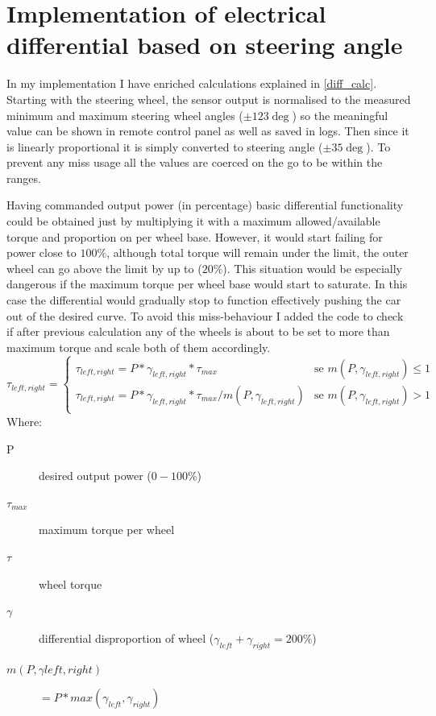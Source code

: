 \section{Implementation of electrical differential based on steering angle}\label{diff_meth}
In my implementation I have enriched calculations explained in \ref{diff_calc}. Starting with the steering wheel, the sensor output is normalised to the measured minimum and maximum steering wheel angles ($\pm123\deg$) so the meaningful value can be shown in remote control panel as well as saved in logs. 
Then since it is linearly proportional it is simply converted to steering angle ($\pm35\deg$). To prevent any miss usage all the values are coerced on the go to be within the ranges.

Having commanded output power (in percentage) basic differential functionality could be obtained just by multiplying it with a maximum allowed/available torque and proportion on per wheel base. However, it would start failing for power close to $100\% $, although total torque will remain under the limit, the outer wheel can go above the limit by up to ($20\% $).
This situation would be especially dangerous if the maximum torque per wheel base would start to saturate. In this case the differential would gradually stop to function effectively pushing the car out of the desired curve.
To avoid this miss-behaviour I added the code to check if after previous calculation any of the wheels is about to be set to more than maximum torque and scale both of them accordingly.
\begin{equation}\label{diff_saf}
    \tau_{left,right} = \begin{cases}
        \tau_{left,right} = P * \gamma_{left,right} * \tau_{max} & \text{se $m(P,\gamma_{left,right}) \leq 1$}\\
        \tau_{left,right} = P * \gamma_{left,right} * \tau_{max} / m(P,\gamma_{left,right}) & \text{se $m(P,\gamma_{left,right}) > 1$}\\
    \end{cases}
\end{equation}
Where:
\begin{description}
    \item[P] desired output power ($0-100\%$)
    \item[$\tau_{max}$] maximum torque per wheel
    \item[$\tau$] wheel torque
    \item[$\gamma$] differential disproportion of wheel ($\gamma_{left}+\gamma_{right}=200\%$)
    \item[$m(P,\gamma{left,right})$] $= P * max(\gamma_{left},\gamma_{right})$
\end{description}


